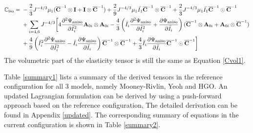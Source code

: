 \begin{equation} \label{Ciso3}
\begin{split}
\mathbb{C}_\mathrm{iso} = {}& 
- \frac{2}{3}J^{-4/3}\mu_1({\overline{\bold{C}}}^{-1} \otimes \bold{I} + \bold{I} \otimes {\overline{\bold{C}}}^{-1})  +
\frac{2}{9}J^{-4/3}\mu_1\bar{I_1}  {\overline{\bold{C}}}^{-1} \otimes {\overline{\bold{C}}}^{-1} + \frac{2}{3}J^{-4/3} \mu_1\bar{I_1} {\overline{\bold{C}}}^{-1} \odot {\overline{\bold{C}}}^{-1} \\
&+ \sum_{i = 4, 6} J^{-4/3} \bigg[ 4\frac{\partial^2\Psi_\mathrm{aniso}}{\partial{\bar{I}_i}^2} \bold{A}_{0i} \otimes \bold{A}_{0i} - \frac{4}{3} \left( \bar{I}_i\frac{\partial^2\Psi_\mathrm{aniso}}{\partial{\bar{I}_i}^2} + \frac{\partial\Psi_\mathrm{aniso}}{\partial{\bar{I}_i}} \right) (\overline{\bold{C}}^{-1} \otimes \bold{A}_{0i} + \bold{A}_{0i} \otimes \overline{\bold{C}}^{-1}) \\
&+ \frac{4}{9} \left( {\bar{I}_i}^2\frac{\partial^2\Psi_\mathrm{aniso}}{\partial{\bar{I}_i}^2} - \bar{I}_i\frac{\partial\Psi_\mathrm{aniso}}{\partial{\bar{I}_i}} \right) \overline{\bold{C}}^{-1} \otimes \overline{\bold{C}}^{-1}
+ \frac{4}{3}\bar{I}_i \frac{\partial\Psi_\mathrm{aniso}}{\partial{\bar{I}_i}} \overline{\bold{C}}^{-1} \odot \overline{\bold{C}}^{-1} \bigg] 
\end{split}
\end{equation}
The volumetric part of the elasticity tensor is still the same as Equation \ref{Cvol1}.

Table \ref{summary1} lists a summary of the derived tensors in the reference configuration for all $3$ models, namely Mooney-Rivlin, Yeoh and HGO. An updated Lagrangian formulation can be derived by using a push-forward approach based on the reference configuration, The detailed derivation can be found in Appendix \ref{updated}. The corresponding summary of equations in the current configuration is shown in Table \ref{summary2}.







